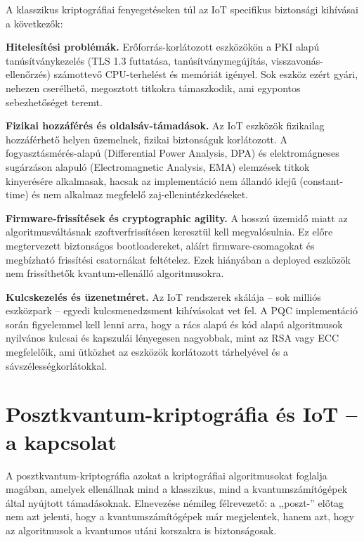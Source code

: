 A klasszikus kriptográfiai fenyegetéseken túl az IoT specifikus biztonsági kihívásai a következők:

\textbf{Hitelesítési problémák.} Erőforrás-korlátozott eszközökön a PKI alapú tanúsítványkezelés
(TLS 1.3 futtatása, tanúsítványmegújítás, visszavonás-ellenőrzés) számottevő CPU-terhelést és
memóriát igényel. Sok eszköz ezért gyári, nehezen cserélhető, megosztott titkokra támaszkodik,
ami egypontos sebezhetőséget teremt.

\textbf{Fizikai hozzáférés és oldalsáv-támadások.} Az IoT eszközök fizikailag hozzáférhető helyen
üzemelnek, fizikai biztonságuk korlátozott. A fogyasztásmérés-alapú (Differential Power Analysis,
DPA) és elektromágneses sugárzáson alapuló (Electromagnetic Analysis, EMA) elemzések titkok
kinyerésére alkalmasak, hacsak az implementáció nem állandó idejű (constant-time) és nem alkalmaz
megfelelő zaj-ellenintézkedéseket.

\textbf{Firmware-frissítések és cryptographic agility.} A hosszú üzemidő miatt az algoritmusváltásnak
szoftverfrissítésen keresztül kell megvalósulnia. Ez előre megtervezett biztonságos bootloadereket,
aláírt firmware-csomagokat és megbízható frissítési csatornákat feltételez. Ezek hiányában a
deployed eszközök nem frissíthetők kvantum-ellenálló algoritmusokra.

\textbf{Kulcskezelés és üzenetméret.} Az IoT rendszerek skálája -- sok milliós eszközpark --
egyedi kulcsmenedzsment kihívásokat vet fel. A PQC implementáció során figyelemmel kell lenni
arra, hogy a rács alapú és kód alapú algoritmusok nyilvános kulcsai és kapszulái lényegesen
nagyobbak, mint az RSA vagy ECC megfelelőik, ami ütközhet az eszközök korlátozott tárhelyével
és a sávszélességkorlátokkal.


\section{Posztkvantum-kriptográfia és IoT -- a kapcsolat}

A posztkvantum-kriptográfia azokat a kriptográfiai algoritmusokat foglalja magában, amelyek
ellenállnak mind a klasszikus, mind a kvantumszámítógépek által nyújtott támadásoknak. Elnevezése
némileg félrevezető: a ,,poszt-'' előtag nem azt jelenti, hogy a kvantumszámítógépek már megjelentek,
hanem azt, hogy az algoritmusok a kvantumos utáni korszakra is biztonságosak.

